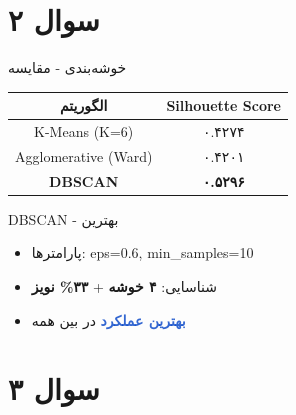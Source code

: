 \documentclass[aspectratio=169]{beamer}
\begin{document}
\section{سوال ۲}

\begin{frame}{خوشه‌بندی - مقایسه}
\begin{table}[h]
\centering
\large
\begin{tabular}{|c|c|}
\hline
\textbf{الگوریتم} & \textbf{Silhouette Score} \\
\hline
K-Means (K=6) & ۰.۴۲۷۴ \\
\hline
Agglomerative (Ward) & ۰.۴۲۰۱ \\
\hline
\textcolor{important}{\textbf{DBSCAN}} & \textcolor{important}{\textbf{۰.۵۲۹۶}} \\
\hline
\end{tabular}
\end{table}

\begin{block}{DBSCAN - بهترین}
\begin{itemize}
\item پارامترها: eps=0.6, min\_samples=10
\item شناسایی: \textbf{۴ خوشه} + \textbf{۳۳\% نویز}
\item \textcolor{highlight}{\textbf{بهترین عملکرد}} در بین همه
\end{itemize}
\end{block}
\end{frame}

\section{سوال ۳}
\end{document}
